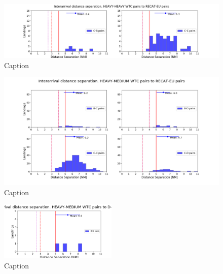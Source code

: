 \begin{figure}
    \centering
    \includegraphics[width=1\textwidth]{graphics/fig_HH_to_RECAT_pairs_dist_separ.png}
    \caption[list of figures caption]{Caption}
    \label{fig:HH_to_RECAT_pairs_dist_separ}
\end{figure}

\begin{figure}
    \centering
    \includegraphics[width=1\textwidth]{graphics/fig_HM_to_RECAT_pairs_dist_separ.png}
    \caption[list of figures caption]{Caption}
    \label{fig:HM_to_RECAT_pairs_dist_separ}
\end{figure}

\begin{figure}
    \centering
    \includegraphics[width=0.5\textwidth]{graphics/fig_HM_to_DD_pairs_dist_separ.png}
    \caption[list of figures caption]{Caption}
    \label{fig:HM_to_DD_pairs_dist_separ}
\end{figure}




